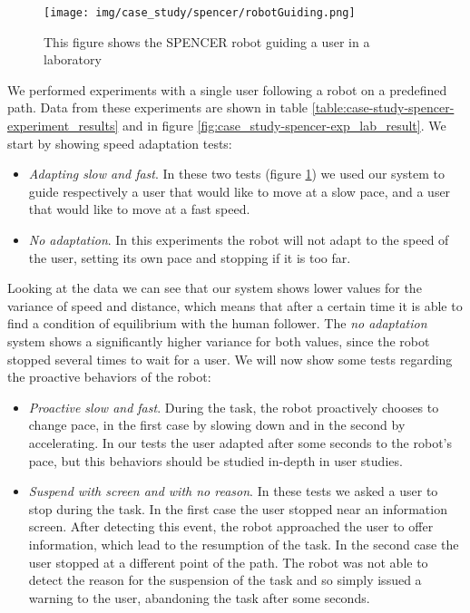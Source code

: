 \begin{figure}[ht!]
	\centering
	\texttt{[image: img/case\_study/spencer/robotGuiding.png]}
	\caption[Robot Guide laboratory experiment]{This figure shows the SPENCER robot guiding a user in a laboratory}
	\label{fig:case_study-spencer-robotGuiding}
\end{figure}

We performed experiments with a single user following a robot on a predefined path. Data from these experiments are shown in table \ref{table:case-study-spencer-experiment_results} and in figure \ref{fig:case_study-spencer-exp_lab_result}. We start by showing speed adaptation tests:
\begin{itemize}
\item \textit{Adapting slow and fast}. In these two tests (figure \ref{fig:case_study-spencer-robotGuiding}) we used our system to guide respectively a user that would like to move at a slow pace, and a user that would like to move at a fast speed.
\item \textit{No adaptation}. In this experiments the robot will not adapt to the speed of the user, setting its own pace and stopping if it is too far.
\end{itemize}

Looking at the data we can see that our system shows lower values for the variance of speed and distance, which means that after a certain time it is able to find a condition of equilibrium with the human follower. The \textit{no adaptation} system shows a significantly higher variance for both values, since the robot stopped several times to wait for a user. We will now show some tests regarding the proactive behaviors of the robot:

\begin{itemize}
\item \textit{Proactive slow and fast}. During the task, the robot proactively chooses to change pace, in the first case by slowing down and in the second by accelerating. In our tests the user adapted after some seconds to the robot's pace, but this behaviors should be studied in-depth in user studies.
\item \textit{Suspend with screen and with no reason}. In these tests we asked a user to stop during the task. In the first case the user stopped near an information screen. After detecting this event, the robot approached the user to offer information, which lead to the resumption of the task. In the second case the user stopped at a different point of the path. The robot was not able to detect the reason for the suspension of the task and so simply   issued a warning to the user, abandoning the task after some seconds.
\end{itemize}


